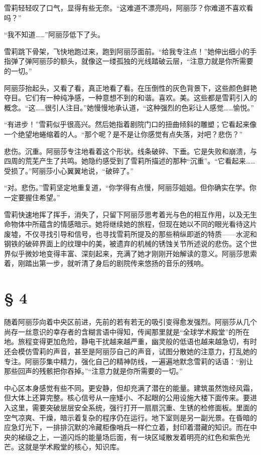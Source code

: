 雪莉轻轻叹了口气，显得有些无奈。“这难道不漂亮吗，阿丽莎？你难道不喜欢看吗？”

“我不知道……”阿丽莎低下了头。

雪莉跳下骨架，飞快地跑过来，跑到阿丽莎面前。“给我专注点！”她伸出细小的手指弹了弹阿丽莎的额头，就像这一缕孤独的光线踏破云层，“注意力就是你所需要的一切。”

阿丽莎抬起头，又看了看，真正地看了看。在压倒性的灰色背景下，这些颜色鲜艳夺目。它们有一种纯净感，一种意想不到的和谐。喜欢。美。这些都是雪莉引入的概念。“这……很引人注目。”她慢慢地承认道，“这种强烈的色彩让人感觉……愉悦。”

“有进步！”雪莉似乎很高兴。然后她指着剧院门口的扭曲倾斜的雕塑；它看起来像一个绝望地蜷缩着的人。“那个呢？是不是让你感觉有点失落，对吧？悲伤？”

悲伤。沉重。阿丽莎专注地看着这个形状。线条破碎、下垂。它是失败和崩溃，与四周的荒芜产生了共鸣。她隐约感受到了雪莉所描述的那种“沉重”。“它看起来……受损了。”阿丽莎小心翼翼地说，“破碎了。”

“对。悲伤。”雪莉坚定地重复道，“你学得有点慢，阿丽莎姐姐。但你确实在学。你一定要握住希望。”

雪莉快速地挥了挥手，消失了，只留下阿丽莎思考着光与色的相互作用，以及无生命物体中所蕴含的情感暗示。她将继续她的旅程，但现在她以不同的眼光看待这片废墟，不仅寻找引导和信号，也寻找雪莉所提及的那些稍纵即逝的特质——水泥和钢铁的破碎界面上的纹理中的美，被遗弃的机械的锈蚀关节所述说的悲伤。这个世界似乎微妙地变得丰富、深刻起来，充满了她才刚刚开始解读的意义。阿丽莎思索着，刚踏出第一步，就听清了身后的剧院传来悠扬的音乐的残响。

\section{§ 4}

随着阿丽莎向着中央区前进，先前的若有若无的吸引变得愈发强烈。阿丽莎从几个尚存一丝意识的幸存者的含糊言语中得知，传闻那里就是“全球学术殿堂”的所在地。旅程变得更加危险，静电干扰越来越严重，幽灵般的低语也越来越急切，有时还会模仿雪莉的声音，甚至是阿丽莎自己的声音，试图分散她的注意力，打乱她的专注。阿丽莎集中精力，强化自己的精神防线，一遍遍地默念雪莉的话语：“别让那些回声的残骸把你吞掉。”“注意力就是你所需要的一切。”

中心区本身感觉有些不同。更安静，但却充满了潜在的能量。建筑虽然饱经风霜，但大体上还算完整。核心信号从一座矮小、不起眼的公用设施大楼下面传来。要进入这里，需要突破层层安全系统，强行打开一扇扇沉重、生锈的检修面板。里面的空气凉爽、干燥，暗示着复杂的程序仍在运行。地下室则是另一副光景。在昏暗的应急灯光下，一排排沉默的冷藏柜像哨兵一样伫立着，封印着潜藏的知识。而在中央的梯级之上，一道闪烁的能量场后面，有一块区域散发着明亮的红色和紫色光芒。这就是学术殿堂的核心，知识库。

